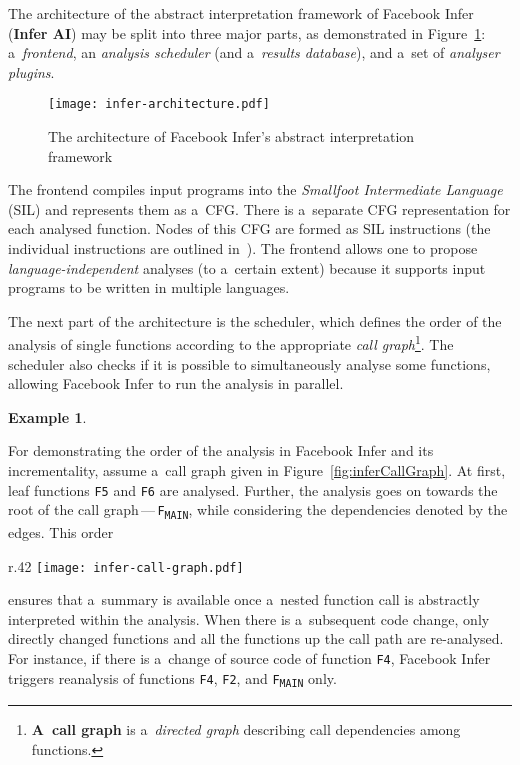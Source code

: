 \documentclass{ExcelAtFIT}
\theoremstyle{definition}
\newtheorem{example}{Example}[section]
\begin{document}
The architecture of the abstract interpretation framework of Facebook Infer (\textbf{Infer AI}) may be split into three major parts, as demonstrated in Figure~\ref{fig:inferArch}: a~\emph{frontend}, an \emph{analysis scheduler} (and a~\emph{results database}), and a~set of \emph{analyser plugins}.

\begin{figure}[hbt]
    \centering
    \texttt{[image: infer-architecture.pdf]}
    \caption{The architecture of Facebook Infer's abstract interpretation framework~\cite{harmimBP}}
    \label{fig:inferArch}
\end{figure}

The frontend compiles input programs into the \emph{Smallfoot Intermediate Language} (SIL) and represents them as a~CFG. There is a~separate CFG representation for each analysed function. Nodes of this CFG are formed as SIL instructions (the individual instructions are outlined in~\cite{harmimBP}). The frontend allows one to propose \emph{language-independent} analyses (to a~certain extent) because it supports input programs to be written in multiple languages.

The next part of the architecture is the scheduler, which defines the order of the analysis of single functions according to the appropriate \emph{call graph}\footnote{\textbf{A~call graph} is a~\emph{directed graph} describing call dependencies among functions.}. The scheduler also checks if it is possible to simultaneously analyse some functions, allowing Facebook Infer to run the analysis in parallel.

\begin{example}
    \label{ex:inferAnalysis}
\end{example}
\vspace{-.49em}
\noindent
For demonstrating the order of the analysis in Facebook Infer and its incrementality, assume a~call graph given in Figure~\ref{fig:inferCallGraph}. At first, leaf functions \texttt{F5} and \texttt{F6} are analysed. Further, the analysis goes on towards the root of the call graph\,---\,\texttt{F\textsubscript{MAIN}}, while considering the dependencies denoted by the edges. This order
\begin{wrapfigure}{r}{.42 \linewidth}
    \centering
    \vspace{-1em}
    \texttt{[image: infer-call-graph.pdf]}
    \label{fig:inferCallGraph}
\end{wrapfigure}
ensures that a~summary is available once a~nested function call is abstractly interpreted within the analysis. When there is a~subsequent code change, only directly changed functions and all the functions up the call path are re-analysed. For instance, if there is a~change of source code of function \texttt{F4}, Facebook Infer triggers reanalysis of functions \texttt{F4}, \texttt{F2}, and \texttt{F\textsubscript{MAIN}} only.
\end{document}
